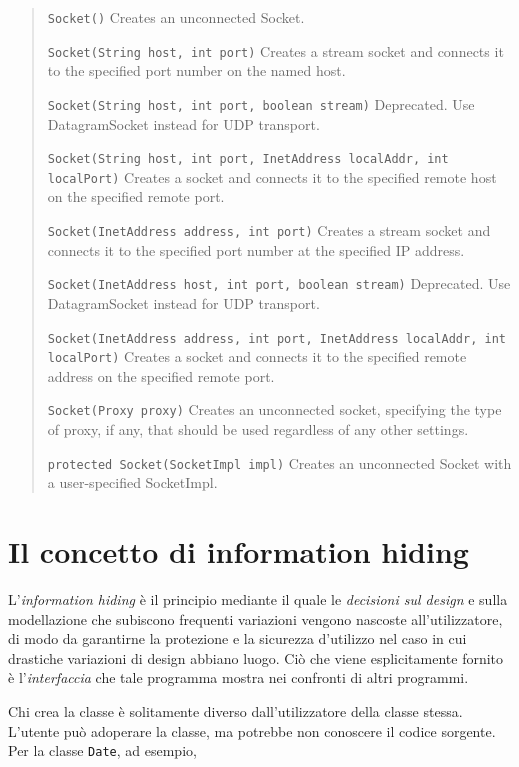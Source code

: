 \documentclass[\fontsizeclass,twocolumn]{\classname}
\theoremstyle{definition}
\theoremstyle{definition}
\begin{document}
\begin{quote}
    \footnotesize{\texttt{Socket()}        Creates an unconnected Socket.

        \texttt{Socket(String host, int port)}        Creates a stream socket and connects it to the specified port number on the named host.

    \texttt{Socket(String host, int port, boolean stream)}        Deprecated. Use DatagramSocket instead for UDP transport.

	\texttt{Socket(String host, int port, InetAddress localAddr, int localPort)}        Creates a socket and connects it to the specified remote host on the specified remote port.

    \texttt{Socket(InetAddress address, int port)}        Creates a stream socket and connects it to the specified port number at the specified IP address.

    \texttt{Socket(InetAddress host, int port, boolean stream)} Deprecated. Use DatagramSocket instead for UDP transport.

	\texttt{Socket(InetAddress address, int port, InetAddress localAddr, int localPort)}        Creates a socket and connects it to the specified remote address on the specified remote port.

    \texttt{Socket(Proxy proxy)}        Creates an unconnected socket, specifying the type of proxy, if any, that should be used regardless of any other settings.

\texttt{protected Socket(SocketImpl impl)}        Creates an unconnected Socket with a user-specified SocketImpl.}
\end{quote}



\section{Il concetto di information hiding}

L'\emph{information hiding} è il principio mediante il quale le \emph{decisioni
sul design} e sulla modellazione che subiscono frequenti variazioni vengono
nascoste all'utilizzatore, di modo da garantirne la protezione e la sicurezza
d'utilizzo nel caso in cui drastiche variazioni di design abbiano luogo. Ciò
che viene esplicitamente fornito è l'\emph{interfaccia} che tale programma
mostra nei confronti di altri programmi.

Chi crea la classe è solitamente diverso dall'utilizzatore della classe stessa.
L'utente può adoperare la classe, ma potrebbe non conoscere il codice sorgente.
Per la classe \texttt{Date}, ad esempio,
\end{document}

